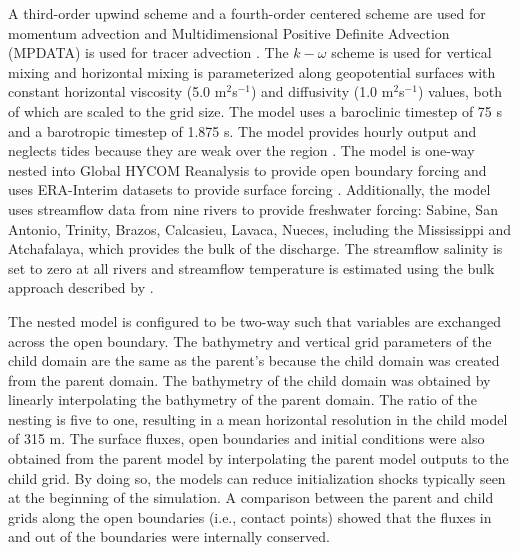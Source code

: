 A third-order upwind scheme and a fourth-order centered scheme are used for momentum advection and Multidimensional Positive Definite Advection (MPDATA) is used for tracer advection \citep{Smolarkiewicz_1998}. The $k-\omega$ scheme is used for vertical mixing \citep{umlauf2003extending, Warner_2005} and horizontal mixing is parameterized along geopotential surfaces with constant horizontal viscosity (5.0 m$^2$s$^{-1}$) and diffusivity (1.0 m$^2$s$^{-1}$) values, both of which are scaled to the grid size. The model uses a baroclinic timestep of 75 s and a barotropic timestep of 1.875 s. The model provides hourly output and neglects tides because they are weak over the region \citep{DiMarco_1998}. The model is one-way nested into Global HYCOM Reanalysis to provide open boundary forcing and uses ERA-Interim datasets to provide surface forcing \citep{Dee_2011}. Additionally, the model uses streamflow data from nine rivers to provide freshwater forcing: Sabine, San Antonio, Trinity, Brazos, Calcasieu, Lavaca, Nueces, including the Mississippi and Atchafalaya, which provides the bulk of the discharge. The streamflow salinity is set to zero at all rivers and streamflow temperature is estimated using the bulk approach described by \citep{Stefan_1993}.

The nested model is configured to be two-way such that variables are exchanged across the open boundary. The bathymetry and vertical grid parameters of the child domain are the same as the parent's because the child domain was created from the parent domain. The bathymetry of the child domain was obtained by linearly interpolating the bathymetry of the parent domain. The ratio of the nesting is five to one, resulting in a mean horizontal resolution in the child model of 315 m. The surface fluxes, open boundaries and initial conditions were also obtained from the parent model by interpolating the parent model outputs to the child grid. By doing so, the models can reduce initialization shocks typically seen at the beginning of the simulation. A comparison between the parent and child grids along the open boundaries (i.e., contact points) showed that the fluxes in and out of the boundaries were internally conserved. 

